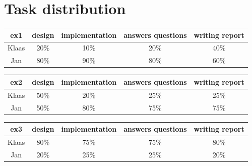 \documentclass[a4paper]{article}
\begin{document}
\newpage
\section*{Task distribution}

\begin{table}[H]
\centering
\begin{tabular}{ccccc}
ex1 & design & implementation & answers questions & writing report \\
\hline
Klaas & 20\% & 10\% & 20\% & 40\% \\
\hline
Jan & 80\% & 90\% & 80\% & 60\% \\
\end{tabular}
\end{table}

\begin{table}[H]
\centering
\begin{tabular}{ccccc}
ex2 & design & implementation & answers questions & writing report \\
\hline
Klaas & 50\% & 20\% & 25\% & 25\% \\
\hline
Jan & 50\% & 80\% & 75\% & 75\% \\
\end{tabular}
\end{table}

\begin{table}[H]
\centering
\begin{tabular}{ccccc}
ex3 & design & implementation & answers questions & writing report \\
\hline
Klaas & 80\% & 75\% & 75\% & 80\% \\
\hline
Jan & 20\% & 25\% & 25\% & 20\% \\
\end{tabular}
\end{table}
\end{document}
